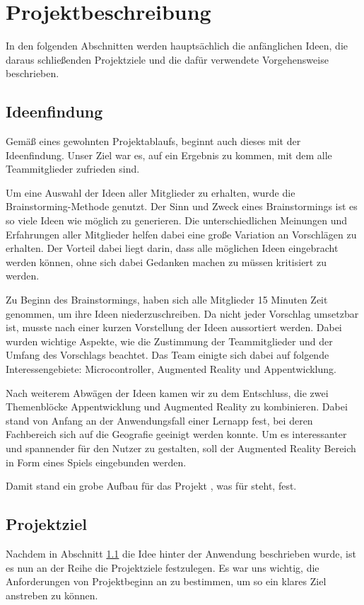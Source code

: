 \chapter{Projektbeschreibung}\label{ch:projektbeschreibung}
In den folgenden Abschnitten werden hauptsächlich die anfänglichen Ideen, die daraus schließenden Projektziele und die dafür verwendete Vorgehensweise beschrieben.

\section{Ideenfindung}\label{ideenfindung}
Gemäß eines gewohnten Projektablaufs, beginnt auch dieses mit der Ideenfindung. Unser Ziel war es, auf ein Ergebnis zu kommen, mit dem alle Teammitglieder zufrieden sind.

Um eine Auswahl der Ideen aller Mitglieder zu erhalten, wurde die Brainstorming-Methode genutzt. Der Sinn und Zweck eines Brainstormings ist es so viele Ideen wie möglich zu generieren. Die unterschiedlichen Meinungen und Erfahrungen aller Mitglieder helfen dabei eine große Variation an Vorschlägen zu erhalten. Der Vorteil dabei liegt darin, dass alle möglichen Ideen eingebracht werden können, ohne sich dabei Gedanken machen zu müssen kritisiert zu werden.

Zu Beginn des Brainstormings, haben sich alle Mitglieder 15 Minuten Zeit genommen, um ihre Ideen niederzuschreiben. Da nicht jeder Vorschlag umsetzbar ist, musste nach einer kurzen Vorstellung der Ideen aussortiert werden. Dabei wurden wichtige Aspekte, wie die Zustimmung der Teammitglieder und der Umfang des Vorschlags beachtet. Das Team einigte sich dabei auf folgende Interessengebiete: Microcontroller, Augmented Reality und Appentwicklung.

Nach weiterem Abwägen der Ideen kamen wir zu dem Entschluss, die zwei Themenblöcke Appentwicklung und Augmented Reality zu kombinieren. Dabei stand von Anfang an der Anwendungsfall einer Lernapp fest, bei deren Fachbereich sich auf die Geografie geeinigt werden konnte. Um es interessanter und spannender für den Nutzer zu gestalten, soll der Augmented Reality Bereich in Form eines Spiels eingebunden werden. 

Damit stand ein grobe Aufbau für das Projekt  , was für  steht, fest.

\section{Projektziel}\label{projektziel}
Nachdem in Abschnitt \ref{ideenfindung} die Idee hinter der Anwendung beschrieben wurde, ist es nun an der Reihe die Projektziele festzulegen. Es war uns wichtig, die Anforderungen von Projektbeginn an zu bestimmen, um so ein klares Ziel anstreben zu können.

